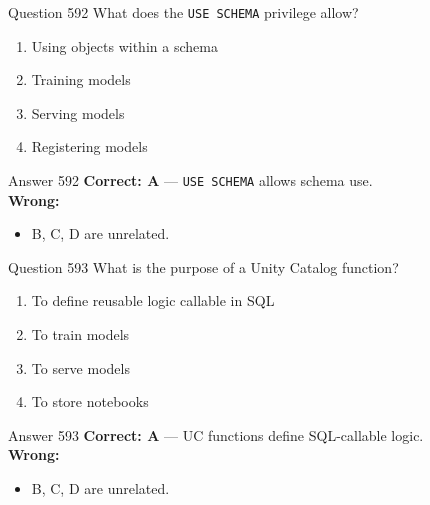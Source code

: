 \documentclass[aspectratio=169,11pt]{beamer}
\begin{document}
	\begin{frame}{Question 592}
		What does the \texttt{USE SCHEMA} privilege allow?
		\begin{enumerate}[label=\Alph*.]
			\item Using objects within a schema
			\item Training models
			\item Serving models
			\item Registering models
		\end{enumerate}
	\end{frame}
	\begin{frame}{Answer 592}
		\textbf{Correct: A} --- \texttt{USE SCHEMA} allows schema use.\\
		\vspace{0.5em}
		\textbf{Wrong:}
		\begin{itemize}
			\item B, C, D are unrelated.
		\end{itemize}
	\end{frame}
	
	\begin{frame}{Question 593}
		What is the purpose of a Unity Catalog function?
		\begin{enumerate}[label=\Alph*.]
			\item To define reusable logic callable in SQL
			\item To train models
			\item To serve models
			\item To store notebooks
		\end{enumerate}
	\end{frame}
	\begin{frame}{Answer 593}
		\textbf{Correct: A} --- UC functions define SQL-callable logic.\\
		\vspace{0.5em}
		\textbf{Wrong:}
		\begin{itemize}
			\item B, C, D are unrelated.
		\end{itemize}
	\end{frame}
	
\end{document}

